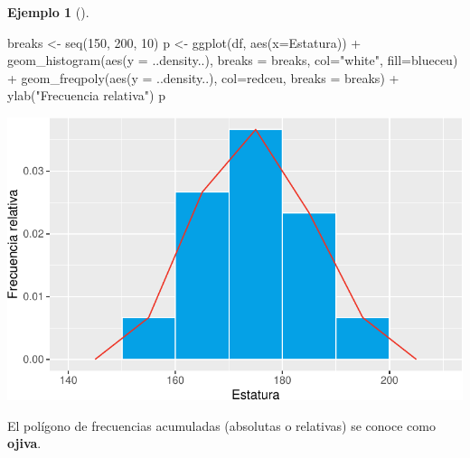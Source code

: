 \documentclass[
  a4paper,
]{scrreport}
\newenvironment{Shaded}{\begin{snugshade}}{\end{snugshade}}
\newcommand{\AttributeTok}[1]{\textcolor[rgb]{0.40,0.45,0.13}{#1}}
\newcommand{\DecValTok}[1]{\textcolor[rgb]{0.68,0.00,0.00}{#1}}
\newcommand{\FunctionTok}[1]{\textcolor[rgb]{0.28,0.35,0.67}{#1}}
\newcommand{\NormalTok}[1]{\textcolor[rgb]{0.00,0.23,0.31}{#1}}
\newcommand{\OtherTok}[1]{\textcolor[rgb]{0.00,0.23,0.31}{#1}}
\newcommand{\SpecialCharTok}[1]{\textcolor[rgb]{0.37,0.37,0.37}{#1}}
\newcommand{\StringTok}[1]{\textcolor[rgb]{0.13,0.47,0.30}{#1}}
\theoremstyle{plain}
\theoremstyle{definition}
\theoremstyle{definition}
\newtheorem{example}{Ejemplo}[chapter]
\theoremstyle{remark}
\begin{document}
\begin{example}[]
\begin{Shaded}
\begin{Highlighting}[]
\NormalTok{breaks }\OtherTok{\textless{}{-}} \FunctionTok{seq}\NormalTok{(}\DecValTok{150}\NormalTok{, }\DecValTok{200}\NormalTok{, }\DecValTok{10}\NormalTok{)}
\NormalTok{p }\OtherTok{\textless{}{-}} \FunctionTok{ggplot}\NormalTok{(df, }\FunctionTok{aes}\NormalTok{(}\AttributeTok{x=}\NormalTok{Estatura)) }\SpecialCharTok{+} 
    \FunctionTok{geom\_histogram}\NormalTok{(}\FunctionTok{aes}\NormalTok{(}\AttributeTok{y =}\NormalTok{ ..density..), }\AttributeTok{breaks =}\NormalTok{ breaks, }\AttributeTok{col=}\StringTok{"white"}\NormalTok{, }\AttributeTok{fill=}\NormalTok{blueceu) }\SpecialCharTok{+}
    \FunctionTok{geom\_freqpoly}\NormalTok{(}\FunctionTok{aes}\NormalTok{(}\AttributeTok{y =}\NormalTok{ ..density..), }\AttributeTok{col=}\NormalTok{redceu, }\AttributeTok{breaks =}\NormalTok{ breaks) }\SpecialCharTok{+}
    \FunctionTok{ylab}\NormalTok{(}\StringTok{"Frecuencia relativa"}\NormalTok{)}
\NormalTok{p}
\end{Highlighting}
\end{Shaded}

\includegraphics{02-estadistica-descriptiva_files/figure-pdf/histograma-frecuencias-relativas-1.pdf}

\end{example}

El polígono de frecuencias acumuladas (absolutas o relativas) se conoce
como \textbf{ojiva}.
\end{document}
